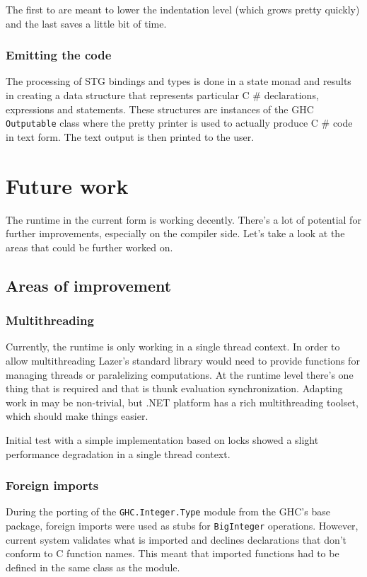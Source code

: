 \documentclass[en]{pracamgr}
\newcommand{\shrp}{%
  {\fontfamily{ppl}\selectfont\#%
  }}
\begin{document}
The first to are meant to lower the indentation level (which grows pretty quickly) and the last saves
a little bit of time.

\subsection{Emitting the code}
The processing of STG bindings and types is done in a state monad and results in creating a data 
structure that represents particular C\shrp{} declarations, expressions and statements.
These structures are instances of the GHC \texttt{Outputable} class where the pretty printer
is used to actually produce C\shrp{} code in text form. The text output is then printed to the user.

\chapter{Future work}\label{r:future}

The runtime in the current form is working decently.
There's a lot of potential for further improvements, especially on the compiler side.
Let's take a look at the areas that could be further worked on.

\section{Areas of improvement}
\subsection{Multithreading}
Currently, the runtime is only working in a single thread context. In order to allow multithreading
Lazer's standard library would need to provide functions for managing threads or paralelizing
computations. At the runtime level there's one thing that is required and that is thunk evaluation
synchronization. Adapting work in \cite{multiprocessor} may be non-trivial, but .NET platform has
a rich multithreading toolset, which should make things easier.

Initial test with a simple implementation based on locks showed a slight performance degradation
in a single thread context.

\subsection{Foreign imports}
During the porting of the \texttt{GHC.Integer.Type} module from the GHC's base package,
foreign imports were used as stubs for \texttt{BigInteger} operations.
However, current system validates what is imported and declines declarations that don't conform
to C function names. This meant that imported functions had to be defined in the same class as the module.
\end{document}
